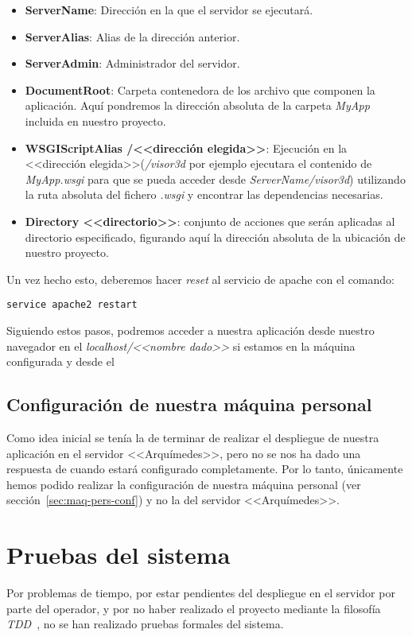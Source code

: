 \begin{itemize}
	\item \textbf{ServerName}: Dirección en la que el servidor se ejecutará.
	\item \textbf{ServerAlias}: Alias de la dirección anterior.
	\item \textbf{ServerAdmin}: Administrador del servidor.
	\item \textbf{DocumentRoot}: Carpeta contenedora de los archivo que componen la aplicación. Aquí pondremos la dirección absoluta de la carpeta \textit{MyApp} incluida en nuestro proyecto.
	\item \textbf{WSGIScriptAlias /<<dirección elegida>>}: Ejecución en la <<dirección elegida>>(\textit{/visor3d} por ejemplo ejecutara el contenido de \textit{MyApp.wsgi} para que se pueda acceder desde \textit{ServerName/visor3d}) utilizando la ruta absoluta del fichero \textit{.wsgi} y encontrar las dependencias necesarias.
	\item \textbf{Directory <<directorio>>}: conjunto de acciones que serán aplicadas al directorio especificado, figurando aquí la dirección absoluta de la ubicación de nuestro proyecto.
\end{itemize}

Un vez hecho esto, deberemos hacer \textit{reset} al servicio de apache con el comando:

\noindent\verb|service apache2 restart|

Siguiendo estos pasos, podremos acceder a nuestra aplicación desde nuestro navegador en el \textit{localhost/<<nombre dado>>} si estamos en la máquina configurada y desde el

\subsection{Configuración de nuestra máquina personal}
Como idea inicial se tenía la de terminar de realizar el despliegue de nuestra aplicación en el servidor <<Arquímedes>>, pero no se nos ha dado una respuesta de cuando estará configurado completamente. Por lo tanto, únicamente hemos podido realizar la configuración de nuestra máquina personal (ver sección~\ref{sec:maq-pers-conf}) y no la del servidor <<Arquímedes>>.

\section{Pruebas del sistema}
Por problemas de tiempo, por estar pendientes del despliegue en el servidor por parte del operador, y por no haber realizado el proyecto mediante la filosofía \textit{TDD}~\cite{wiki:TDD}, no se han realizado pruebas formales del sistema.